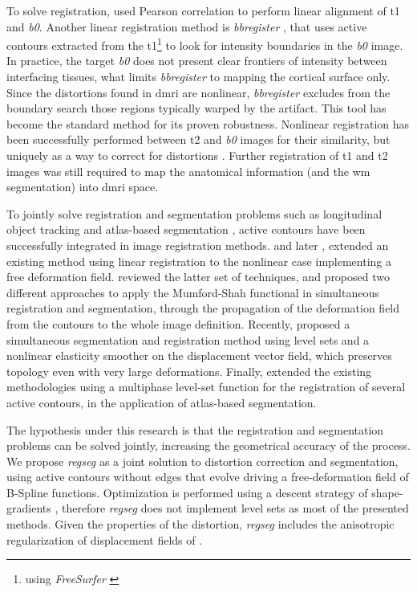 To solve registration, \cite{saad_new_2009} used Pearson correlation to perform linear
  alignment of \gls*{t1} and \emph{b0}.
Another linear registration method is \emph{bbregister} \citep{greve_accurate_2009},
  that uses active contours extracted from the \gls*{t1}\footnote{using \emph{FreeSurfer}
  \citep{fischl_freesurfer_2012}} to look for intensity boundaries in the \emph{b0}
  image.
In practice, the target \emph{b0} does not present clear frontiers of intensity between
  interfacing tissues, what limits \emph{bbregister} to mapping the cortical surface only.
Since the distortions found in \gls*{dmri} are nonlinear, \emph{bbregister} excludes
  from the boundary search those regions typically warped by the artifact.
This tool has become the standard method for its proven robustness.
Nonlinear registration has been successfully performed between \gls*{t2} and \emph{b0}
  images for their similarity, but uniquely as a way to correct for distortions
  \citep{kybic_unwarping_2000,studholme_accurate_2000,wu_comparison_2008,tao_variational_2009}.
Further registration of \gls*{t1} and \gls*{t2} images was still required to map the anatomical
  information (and the \gls*{wm} segmentation) into \gls*{dmri} space.


To jointly solve registration and segmentation problems such as longitudinal object
  tracking \citep{paragios_level_2003} and atlas-based segmentation 
  \citep{gorthi_active_2011}, active contours have been successfully integrated 
  in image registration methods.
\cite{unal_coupled_2005} and later \cite{wang_joint_2006},
  extended an existing method using linear registration \citep{yezzi_variational_2003}
  to the nonlinear case implementing a free deformation field.
\cite{droske_mumfordshah_2009} reviewed the latter set of techniques, and proposed two different
  approaches to apply the Mumford-Shah functional \citep{mumford_optimal_1989} in simultaneous
  registration and segmentation, through the propagation of the deformation field from
  the contours to the whole image definition.
Recently, \cite{guyader_combined_2011} proposed a simultaneous segmentation and
  registration method using level sets and a nonlinear elasticity smoother on the
  displacement vector field, which preserves topology even with very large deformations.
Finally, \cite{gorthi_active_2011} extended the existing methodologies using a multiphase
  level-set function for the registration of several active contours, in the application
  of atlas-based segmentation.
  
The hypothesis under this research is that the registration and segmentation
  problems can be solved jointly, increasing the geometrical accuracy of the process.
We propose \emph{regseg} as a joint solution to distortion correction and segmentation,
  using active contours without edges \citep{chan_active_2001} that evolve driving a
  free-deformation field of B-Spline functions.
Optimization is performed using a descent strategy of shape-gradients
  \citep{herbulot_segmentation_2006,besson_dream2s_2003}, therefore \emph{regseg}
  does not implement level sets as most of the presented methods.
Given the properties of the distortion, \emph{regseg} includes the anisotropic regularization
  of displacement fields of \cite{nagel_investigation_1986}.


